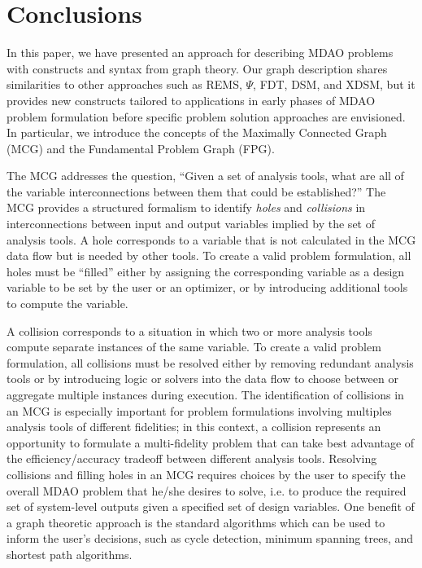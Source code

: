\section*{Conclusions}
In this paper, we have presented an approach for describing MDAO problems with constructs and syntax from graph theory. 
Our graph description shares similarities to other approaches such as REMS, $\Psi$, FDT, DSM, and XDSM, but it provides new constructs tailored to applications in early phases of MDAO problem formulation before specific problem solution approaches are envisioned. 
In particular, we introduce the concepts of the Maximally Connected Graph (MCG) and the Fundamental Problem Graph (FPG). 

The MCG addresses the question, ``Given a set of analysis tools, what are all of the variable interconnections between them that could be established?''  
The MCG provides a structured formalism to identify \textit{holes} and \textit{collisions} in interconnections between input and output variables implied by the set of analysis tools. 
A hole corresponds to a variable that is not calculated in the MCG data flow but is needed by other tools. 
To create a valid problem formulation, all holes must be ``filled'' either by assigning the corresponding variable as a design variable to be set by the user or an optimizer, or by introducing additional tools to compute the variable.  

A collision corresponds to a situation in which two or more analysis tools compute separate instances of the same variable. 
To create a valid problem formulation, all collisions must be resolved either by removing redundant analysis tools or by introducing logic or solvers into the data flow to choose between or aggregate multiple instances during execution. 
The identification of collisions in an MCG is especially important for problem formulations involving multiples analysis tools of different fidelities; in this context, a collision represents an opportunity to formulate a multi-fidelity problem that can take best advantage of the efficiency/accuracy tradeoff between different analysis tools. 
Resolving collisions and filling holes in an MCG requires choices by the user to specify the overall MDAO problem that he/she desires to solve, i.e. to produce the required set of system-level outputs given a specified set of design variables. 
One benefit of a graph theoretic approach is the standard algorithms which can be used to inform the user's decisions, such as cycle detection, minimum spanning trees, and shortest path algorithms.

